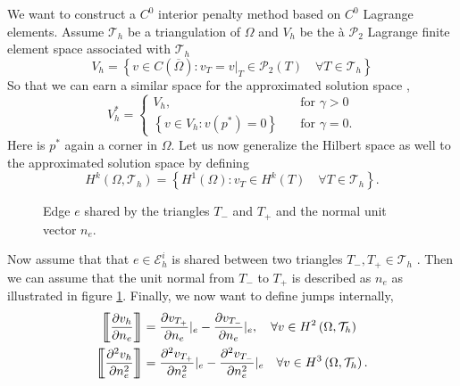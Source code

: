 We want to construct a $C^{0}$ interior penalty method based on $C^{0}$ Lagrange elements.
Assume $\mathcal{T}_{h} $ be a triangulation of $\Omega $ and $V_{h}$ be the à $\mathcal{P}_{2} $ Lagrange finite
element space associated with $\mathcal{T}_{h} $ \[
V_{h} = \left\{ v \in C\left( \overline{\Omega } \right) : v_{T} = v |_{T} \in \mathcal{P}_{2}\left( T \right) \quad
\forall T \in  \mathcal{T} _{h}  \right\}
\]
So that we can earn a similar space for the approximated solution space ,
\[
V_{h}^{*} = \begin{cases}
    V_{h}, \quad & \text{for } \gamma >0\\
    \left\{ v \in V_{h}: v\left( p^{*} \right) = 0 \right\} \quad & \text{for } \gamma = 0.
\end{cases}
\]
Here is $p^{*}$ again a corner in $\Omega $. Let us now generalize the Hilbert space as well to the approximated
solution space by defining \[
H^{k}\left( \Omega , \mathcal{T} _{h}  \right) = \left\{ H^{1}\left( \Omega  \right): v_{T} \in H^{k}\left( T
\right)\quad \forall T \in \mathcal{T} _{h} \right\}.
\]
\begin{figure}[!h]
\centering
{}
\caption{Edge $e$ shared by the triangles $T_{-}$ and $T_{+}$ and the normal unit vector $n_{e}$.  }
    \label{fig:normal}
\end{figure}

Now assume that that $e \in \mathcal{E}_{h}^{i} $ is shared between two triangles $T_{-}, T_{+} \in  \mathcal{T} _{h}$ .
Then we can assume that the unit normal from $T_{-}$ to $T_{+}$ is described as $n_{e}$ as illustrated in figure
\ref{fig:normal}. Finally, we now want to define jumps internally, \[
\begin{split}
    \jump{ \frac{\partial v_{h}}{\partial n_{e}} } &= \frac{\partial v_{T_{+}}}{\partial n_{e}  } | _{e} -
    \frac{\partial v_{T_{-}}}{\partial n_{e}  } |_{e}, \quad \forall v \in H^{2}\left( \Omega , \mathcal{T} _{h} \right)  \\
    \jump{ \frac{\partial ^2 v_{h}}{\partial n_{e} ^2 } } &= \frac{\partial ^2 v_{T_{+}}}{\partial  n_{e}^2} |_{e}  -
    \frac{\partial ^2 v_{T_{-}}}{\partial n_{e}^2   } |_{e} \quad \forall v \in H^3\left( \Omega , \mathcal{T} _{h}
    \right).  \\
\end{split}
\]

